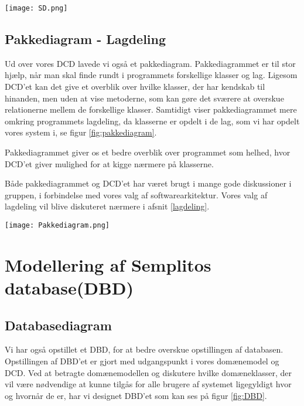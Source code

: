 \begin{sidewaysfigure}
    \caption{SD for SOC Operation - createAppointment}
    \centering
        \texttt{[image: SD.png]}
    \label{fig:SD}
\end{sidewaysfigure}

\subsection{Pakkediagram - Lagdeling}
\label{Pakkediagram}

Ud over vores DCD lavede vi også et pakkediagram.
Pakkediagrammet er til stor hjælp, når man skal finde rundt i programmets forskellige klasser og lag.
Ligesom DCD'et kan det give et overblik over hvilke klasser, der har kendskab til hinanden, men uden at vise metoderne, som kan gøre det sværere at overskue relationerne mellem de forskellige klasser.
Samtidigt viser pakkediagrammet mere omkring programmets lagdeling, da klasserne er opdelt i de lag, som vi har opdelt vores system i, se figur \ref{fig:pakkediagram}.

Pakkediagrammet giver os et bedre overblik over programmet som helhed, hvor DCD'et giver mulighed for at kigge nærmere på klasserne.

Både pakkediagrammet og DCD'et har været brugt i mange gode diskussioner i gruppen, i forbindelse med vores valg af softwarearkitektur.
Vores valg af lagdeling vil blive diskuteret nærmere i afsnit \ref{lagdeling}.

\begin{sidewaysfigure}
    \caption{Pakkediagram for systemet}
    \centering
        \texttt{[image: Pakkediagram.png]}
    \label{fig:pakkediagram}
\end{sidewaysfigure}

\section{Modellering af Semplitos database(DBD)}
\subsection{Databasediagram}
\label{DBD}


Vi har også opstillet et DBD, for at bedre overskue opstillingen af databasen.
Opstillingen af DBD'et er gjort med udgangspunkt i vores domænemodel og DCD.
Ved at betragte domænemodellen og diskutere hvilke domæneklasser, der vil være nødvendige at kunne tilgås for alle brugere af systemet ligegyldigt hvor og hvornår de er, har vi designet DBD'et som kan ses på figur \ref{fig:DBD}.

